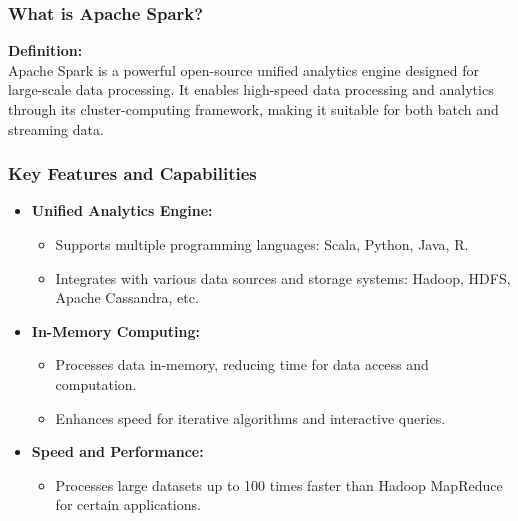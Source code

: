 \documentclass[aspectratio=169]{beamer}
\begin{document}
\begin{frame}[fragile]
    \frametitle{What is Apache Spark?}
    \textbf{Definition:} \\
    Apache Spark is a powerful open-source unified analytics engine designed for large-scale data processing. It enables high-speed data processing and analytics through its cluster-computing framework, making it suitable for both batch and streaming data.
\end{frame}

\begin{frame}[fragile]
    \frametitle{Key Features and Capabilities}
    \begin{itemize}
        \item \textbf{Unified Analytics Engine:}
            \begin{itemize}
                \item Supports multiple programming languages: Scala, Python, Java, R.
                \item Integrates with various data sources and storage systems: Hadoop, HDFS, Apache Cassandra, etc.
            \end{itemize}
        \item \textbf{In-Memory Computing:}
            \begin{itemize}
                \item Processes data in-memory, reducing time for data access and computation.
                \item Enhances speed for iterative algorithms and interactive queries.
            \end{itemize}
        \item \textbf{Speed and Performance:}
            \begin{itemize}
                \item Processes large datasets up to 100 times faster than Hadoop MapReduce for certain applications.
            \end{itemize}
    \end{itemize}
\end{frame}
\end{document}
